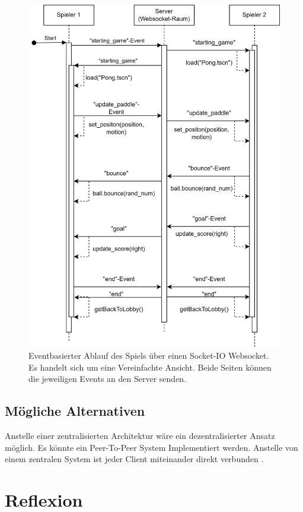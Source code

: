 \documentclass[
]{article}
\begin{document}
\begin{figure}[H]
	\centering
	\includegraphics[width=\textwidth ]{resources/Event-Based-Spielablauf.png}
	\caption{Eventbasierter Ablauf des Spiels über einen Socket-IO Websocket. Es handelt sich um eine Vereinfachte Ansicht. Beide Seiten können die jeweiligen Events an den Server senden.}
	\label{fig:ablaufdiagramm-spiel}
\end{figure}

\subsection{Mögliche Alternativen}
Anstelle einer zentralisierten Architektur wäre ein dezentralisierter Ansatz möglich. Es könnte ein Peer-To-Peer System Implementiert werden. Anstelle von einem zentralen System ist jeder Client miteinander direkt verbunden \cite{gordon2001distributed}.

\section{Reflexion}
\end{document}
